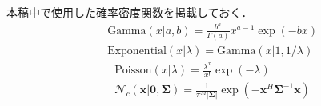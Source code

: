 \documentclass[tombow,Proof]{kkg-repub} %
\begin{document}
\frontmatter
%
%
\tableofcontents
\mainmatter
%








\appendix %

本稿中で使用した確率密度関数を掲載しておく．
\begin{align}
&\mbox{Gamma}(x|a,b) = \frac{b^a}{\Gamma(a)} x^{a - 1} \exp(- bx)
\\
&\mbox{Exponential}(x|\lambda) = \mbox{Gamma}(x|1,1/\lambda)
\end{align}
\begin{align}
&\mbox{Poisson}(x|\lambda) = \frac{\lambda^x}{x!}\exp(-\lambda)
\\
&\mathcal{N}_c(\bm{x}|\bm{0},\bm\Sigma) 
= \frac{1}{\pi^M |\bm\Sigma|} \exp(- \bm{x}^H \bm\Sigma^{-1} \bm{x})
\end{align}

%
\backmatter
%
\end{document}

